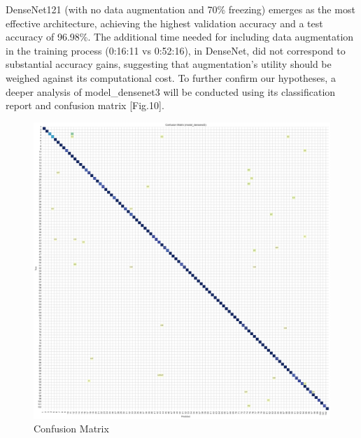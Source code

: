 \vspace{0.3cm}

DenseNet121 (with no data augmentation and 70\% freezing) emerges as the most effective architecture, achieving the
highest validation accuracy and a test accuracy of 96.98\%. The additional time needed for including data augmentation
in the training process (0:16:11 vs 0:52:16), in DenseNet, did not correspond to substantial accuracy gains, suggesting that augmentation's utility should
be weighed against its computational cost. To further confirm our hypotheses, a deeper analysis of model\_densenet3
will be conducted using its classification report and confusion matrix [Fig.10].

\begin{figure}[h!]
    \centering
    \includegraphics[width=\linewidth]{Images/Confusion Matrix}
    \caption{Confusion Matrix}
\end{figure}

